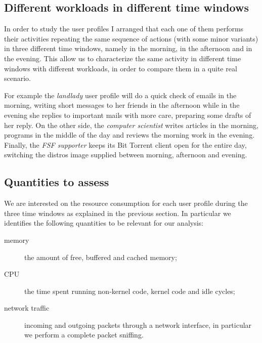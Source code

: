 \documentclass[10pt,a4paper]{article}
\begin{document}
    \subsection{Different workloads in different time windows}
    In order to study the user profiles I arranged that each one of
    them performs their activities repeating the same sequence of
    actions (with some minor variants) in three different time
    windows, namely in the morning, in the afternoon and in the
    evening. This allow us to characterize the same activity in
    different time windows with different workloads, in order to
    compare them in a quite real scenario.

    For example the \emph{landlady} user profile will do a quick check
    of emails in the morning, writing short messages to her friends in
    the afternoon while in the evening she replies to important mails
    with more care, preparing some drafts of her reply.  On the other
    side, the \emph{computer scientist} writes articles in the
    morning, programs in the middle of the day and reviews the morning
    work in the evening.  Finally, the \emph{FSF supporter} keeps its
    Bit Torrent client open for the entire day, switching the distros
    image supplied between morning, afternoon and evening.


    \subsection{Quantities to assess}
    We are interested on the resource consumption for each user
    profile during the three time windows as explained in the previous
    section. In particular we identifies the following quantities to
    be relevant for our analysis:
    \begin{description}
    \item[memory] the amount of free, buffered and cached memory;
    \item[CPU] the time spent running non-kernel code, kernel code and
      idle cycles;
    \item[network traffic] incoming and outgoing packets through a
      network interface, in particular we perform a complete packet
      sniffing.
    \end{description}
    
\end{document}
